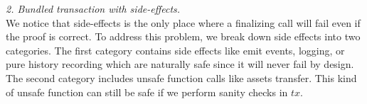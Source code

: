 






\smallskip\noindent\emph{2. Bundled transaction with side-effects.}\\
We notice that side-effects is the only place where a finalizing call will fail even if the proof is correct. To address this problem, we break down side effects into two categories. The first category contains side effects like emit events, logging, or pure history recording which are naturally safe since it will never fail by design. The second category includes unsafe function calls like assets transfer. This kind of unsafe function can still be safe if we perform sanity checks in $tx$.


